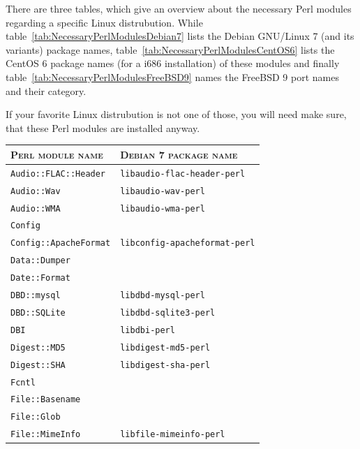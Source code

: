 \documentclass[a4paper,oneside,10pt]{report}
\newenvironment{colframeimportantnote}{%
  \begin{Sbox}
    \begin{minipage}{.99\columnwidth}
}{%
  \end{minipage}
  \end{Sbox}
  \begin{center}
    \fcolorbox{black}{Orange}{\TheSbox}
  \end{center}
}
\begin{document}
There are three tables, which give an overview about the necessary Perl modules regarding a specific Linux distrubution. While table~\ref{tab:NecessaryPerlModulesDebian7} lists the Debian GNU/Linux 7 (and its variants) package names, table~\ref{tab:NecessaryPerlModulesCentOS6} lists the CentOS 6 package names (for a i686 installation) of these modules and finally table~\ref{tab:NecessaryPerlModulesFreeBSD9} names the FreeBSD 9 port names and their category.

\begin{colframeimportantnote}
If your favorite Linux distrubution is not one of those, you will need make sure, that these Perl modules are installed anyway.
\end{colframeimportantnote}

\begin{table}
	\centering
	\begin{tabular}{|p{15em}|p{18em}|}
		\hline
		\textsc{Perl module name} 						& \textsc{Debian 7 package name} \\
		\hline
		\hline
		\verb|Audio::FLAC::Header| 						& \verb|libaudio-flac-header-perl| \\
		\hline
		\verb|Audio::Wav| 										& \verb|libaudio-wav-perl| \\
		\hline
		\verb|Audio::WMA| 										& \verb|libaudio-wma-perl| \\
		\hline
		\verb|Config| 												& \\
		\hline
		\verb|Config::ApacheFormat|						& \verb|libconfig-apacheformat-perl| \\
		\hline
		\verb|Data::Dumper| 									& \\
		\hline
		\verb|Date::Format| 									& \\
		\hline
		\verb|DBD::mysql|											& \verb|libdbd-mysql-perl| \\
		\hline
		\verb|DBD::SQLite|										& \verb|libdbd-sqlite3-perl| \\
		\hline
		\verb|DBI|														& \verb|libdbi-perl| \\
		\hline
		\verb|Digest::MD5| 										& \verb|libdigest-md5-perl| \\
		\hline
		\verb|Digest::SHA| 										& \verb|libdigest-sha-perl| \\
		\hline
		\verb|Fcntl| 													& \\
		\hline
		\verb|File::Basename| 								& \\
		\hline
		\verb|File::Glob| 										& \\
		\hline
		\verb|File::MimeInfo| 								& \verb|libfile-mimeinfo-perl| \\

\end{tabular}
\end{table}
\end{document}
